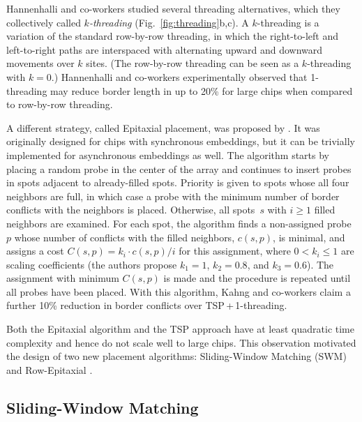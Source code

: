 \documentclass{w-edbk}
\begin{document}
Hannenhalli and co-workers studied several threading alternatives,
which they collectively called \emph{$k$-threading}
(Fig.~\ref{fig:threading}b,c). A $k$-threading is a variation of the
standard row-by-row threading, in which the right-to-left and
left-to-right paths are interspaced with alternating upward and
downward movements over $k$ sites. (The row-by-row threading can be
seen as a $k$-threading with $k=0$.) Hannenhalli and co-workers
experimentally observed that 1-threading may reduce border length in up to
20\% for large chips when compared to row-by-row threading.

A different strategy, called Epitaxial placement, was proposed by
\citet{Kahng2002}. It was originally designed for chips with synchronous
embeddings, but it can be trivially implemented for asynchronous embeddings as
well. The algorithm starts by placing a random probe in the center of the array
and continues to insert probes in spots adjacent to already-filled spots.
Priority is given to spots whose all four neighbors are full, in which case a
probe with the minimum number of border conflicts with the neighbors is placed.
Otherwise, all spots~$s$ with $i \geq 1$ filled neighbors are examined. For each
spot, the algorithm finds a non-assigned probe~$p$ whose number of conflicts
with the filled neighbors, $c(s,p)$, is minimal, and assigns a cost
$C(s,p) = k_i \cdot c(s,p) / i$ for this assignment, where $0 < k_i \leq 1$ are
scaling coefficients (the authors propose $k_1 = 1$, $k_2 = 0.8$, and
$k_3 = 0.6$). The assignment with minimum $C(s,p)$ is made and the procedure is
repeated until all probes have been placed. With this algorithm, Kahng and
co-workers claim a further 10\% reduction in border conflicts over
TSP\,+\,1-threading.

Both the Epitaxial algorithm and the TSP approach have at least quadratic time
complexity and hence do not scale well to large chips. This observation
motivated the design of two new placement algorithms: Sliding-Window Matching
(SWM) and Row-Epitaxial \citep{Kahng2003}.



\subsection{Sliding-Window Matching}
\end{document}
